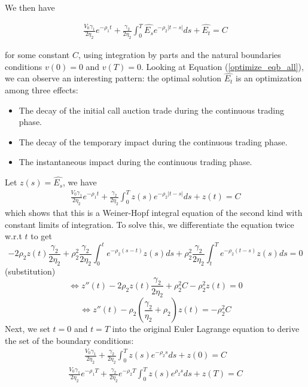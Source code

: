 \documentclass{article}
\begin{document}
We then have

\begin{equation}\label{optimize_eqb_all}
  \begin{aligned}
    \frac{V_0 \gamma_1}{2 \eta_2} e^{-\rho_1 t}
    + \frac{\gamma_2}{2 \eta_2} \int_0^T  \hat{E_s} e^{-\rho_2|t-s|} ds
    + \hat{E_t} = C
  \end{aligned}
\end{equation}

for some constant $C$, using integration by parts and the natural boundaries conditions $v(0)=0$ and $v(T)=0$.
Looking at Equation (\ref{optimize_eqb_all}), we can observe an interesting pattern: the optimal solution $\hat{E_t}$ is an optimization among three effects:

\begin{itemize}
  \item The decay of the initial call auction trade during the continuous trading phase.
  \item The decay of the temporary impact during the continuous trading phase.
  \item The instantaneous impact during the continuous trading phase.
\end{itemize}
Let $z(s)=\hat{E_s}$, we have
\[
  \begin{aligned}
    \frac{V_0 \gamma_1}{2 \eta_2} e^{-\rho_1 t}
    + \frac{\gamma_2}{2 \eta_2} \int_0^T  z(s) e^{-\rho_2|t-s|} ds
    + z(t) = C
  \end{aligned}
\]
which shows that this is a Weiner-Hopf integral equation of the second kind with constant limits of integration. To solve this, we differentiate the equation twice w.r.t $t$ to get
\[
  -2 \rho_2 z(t) \frac{\gamma_2}{2 \eta_2} + \rho_2^2 \frac{\gamma_2}{2 \eta_2} \int_0^t e^{-\rho_2(s-t)} z(s) ds + \rho_2^2 \frac{\gamma_2}{2 \eta_2} \int_t^T e^{-\rho_2(t-s)} z(s) ds = 0
\]
(substitution)
\[
  \Leftrightarrow z{''}(t) - 2 \rho_2 z(t) \frac{\gamma_2}{2 \eta_2} + \rho_2^2 C - \rho_2^2 z(t) = 0
\]
\[
  \Leftrightarrow z{''}(t)  - \rho_2\left(\frac{\gamma_2}{\eta_2} + \rho_2 \right) z(t) = -\rho_2^2 C
\]
Next, we set $t=0$ and $t=T$ into the original Euler Lagrange equation to derive the set of the boundary conditions:
\[
  \begin{aligned}
    \frac{V_0 \gamma_1}{2 \eta_2} + \frac{\gamma_2}{2 \eta_2} \int_0^T  z(s) e^{-\rho_2 s} ds + z(0) = C
  \end{aligned}
\]
\[
  \begin{aligned}
    \frac{V_0 \gamma_1}{2 \eta_2} e^{-\rho_1 T} + \frac{\gamma_2}{2 \eta_2} e^{-\rho_2 T}\int_0^T  z(s) e^{\rho_2 s} ds + z(T) = C
  \end{aligned}
\]
\end{document}
